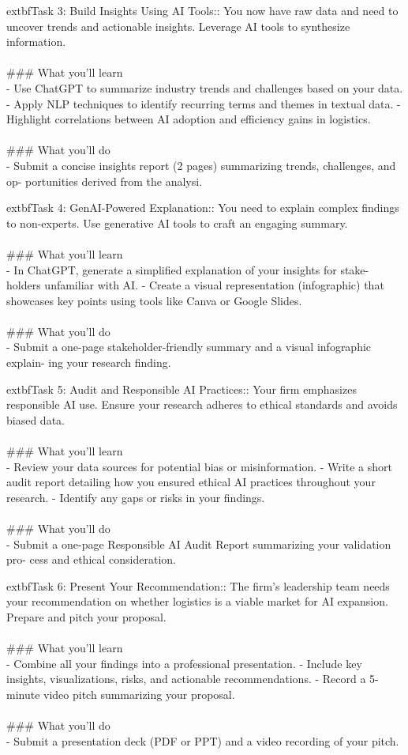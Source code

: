 \documentclass{article}
\begin{document}
	extbf{Task 3:} Build Insights Using AI Tools:: You now have raw data and need to uncover trends and actionable insights. Leverage AI tools to synthesize information. \\
 \\
### What you'll learn \\
- Use ChatGPT to summarize industry trends and challenges based on your data. - Apply NLP techniques to identify recurring terms and themes in textual data. - Highlight correlations between AI adoption and efficiency gains in logistics. \\
 \\
### What you'll do \\
- Submit a concise insights report (2 pages) summarizing trends, challenges, and op- portunities derived from the analysi.

	extbf{Task 4:} GenAI-Powered Explanation:: You need to explain complex findings to non-experts. Use generative AI tools to craft an engaging summary. \\
 \\
### What you'll learn \\
- In ChatGPT, generate a simplified explanation of your insights for stake- holders unfamiliar with AI. - Create a visual representation (infographic) that showcases key points using tools like Canva or Google Slides.  \\
 \\
### What you'll do \\
- Submit a one-page stakeholder-friendly summary and a visual infographic explain- ing your research finding.

	extbf{Task 5:} Audit and Responsible AI Practices:: Your firm emphasizes responsible AI use. Ensure your research adheres to ethical standards and avoids biased data. \\
 \\
### What you'll learn \\
- Review your data sources for potential bias or misinformation. - Write a short audit report detailing how you ensured ethical AI practices throughout your research. - Identify any gaps or risks in your findings. \\
 \\
### What you'll do \\
- Submit a one-page Responsible AI Audit Report summarizing your validation pro- cess and ethical consideration.

	extbf{Task 6:} Present Your Recommendation:: The firm’s leadership team needs your recommendation on whether logistics is a viable market for AI expansion. Prepare and pitch your proposal. \\
 \\
### What you'll learn \\
- Combine all your findings into a professional presentation. - Include key insights, visualizations, risks, and actionable recommendations. - Record a 5-minute video pitch summarizing your proposal. \\
 \\
### What you'll do \\
- Submit a presentation deck (PDF or PPT) and a video recording of your pitch.
\end{document}
